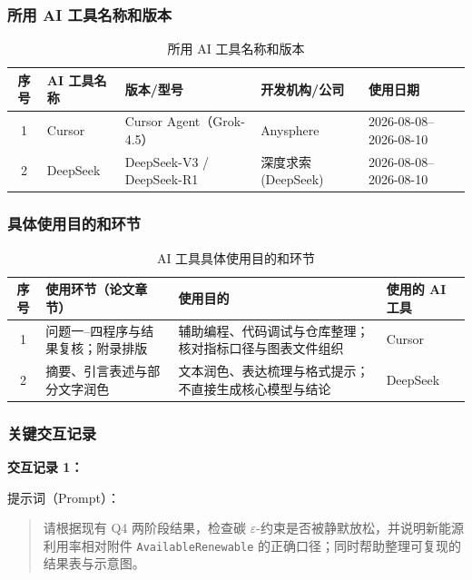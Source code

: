 \documentclass[UTF8,a4paper,zihao=-4]{ctexart}
\renewcommand{\arraystretch}{1}
\begin{document}
\subsubsection{所用 AI 工具名称和版本}

\begin{table}[H]
\centering
\small
\caption{所用 AI 工具名称和版本}
\label{tab:ai-tools}
\begin{tabular}{cllll}
\toprule
序号 & AI 工具名称 & 版本/型号 & 开发机构/公司 & 使用日期 \\
\midrule
1 & Cursor & Cursor Agent（Grok-4.5） & Anysphere & 2026-08-08--2026-08-10 \\
2 & DeepSeek & DeepSeek-V3 / DeepSeek-R1 & 深度求索(DeepSeek) & 2026-08-08--2026-08-10 \\
\bottomrule
\end{tabular}
\end{table}

\subsubsection{具体使用目的和环节}

\begin{table}[H]
\centering
\small
\caption{AI 工具具体使用目的和环节}
\label{tab:ai-purpose}
\renewcommand{\arraystretch}{1.15}
\begin{tabular}{clp{4.2cm}l}
\toprule
序号 & 使用环节（论文章节） & 使用目的 & 使用的 AI 工具 \\
\midrule
1 & 问题一--四程序与结果复核；附录排版 & 辅助编程、代码调试与仓库整理；核对指标口径与图表文件组织 & Cursor \\
2 & 摘要、引言表述与部分文字润色 & 文本润色、表达梳理与格式提示；不直接生成核心模型与结论 & DeepSeek \\
\bottomrule
\end{tabular}
\end{table}

\subsubsection{关键交互记录}

\textbf{交互记录 1：}

提示词（Prompt）：
\begin{quote}
\small
请根据现有 Q4 两阶段结果，检查碳 $\varepsilon$-约束是否被静默放松，并说明新能源利用率相对附件 \texttt{AvailableRenewable} 的正确口径；同时帮助整理可复现的结果表与示意图。
\end{quote}
\end{document}

